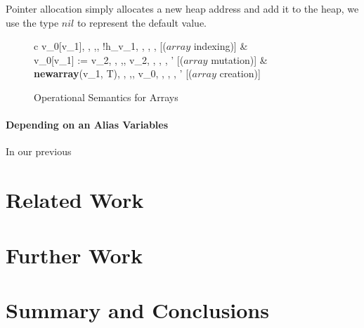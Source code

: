 \documentclass[a4paper,12pt]{report}
\begin{document}
\par
Pointer allocation simply allocates a new heap address and add it to the heap, 
we use the type $nil$ to represent the default value. 


\begin{figure}[H]
  \begin{center}
    \begin{tabular} {c}
        {\langle v_0[v_1], \sigma, \rho,\tau,\Delta \rangle 
          \longrightarrow \langle !h_{v_1}, \sigma, \rho, \tau, \Delta \rangle} [($array$ indexing)]
      & \\
        {\langle v_0[v_1] := v_2, \sigma, \rho,\tau,\Delta \rangle 
          \longrightarrow \langle v_2, \sigma, \rho, \tau, \Delta' \rangle} [($array$ mutation)]
     & \\
        {\langle \textbf{newarray}(v_1, T), \sigma, \rho,\tau,\Delta \rangle 
          \longrightarrow \langle v_0, \sigma, \rho, \tau, \Delta' \rangle} [($array$ creation)]
    \end{tabular}
  \end{center}
  \caption{Operational Semantics for Arrays}
\end{figure}


\subsubsection{Depending on an Alias Variables}
In our previous 





\chapter{Related Work}

\chapter{Further Work}

\chapter{Summary and Conclusions} 


\appendix
\singlespacing

\printbibliography
\end{document}
